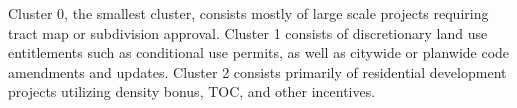 Cluster 0, the smallest cluster, consists mostly of large scale projects requiring tract map or subdivision approval.
Cluster 1 consists of discretionary land use entitlements such as conditional use permits, as well as citywide or planwide code amendments and updates.
Cluster 2 consists primarily of residential development projects utilizing density bonus, TOC, and other incentives.